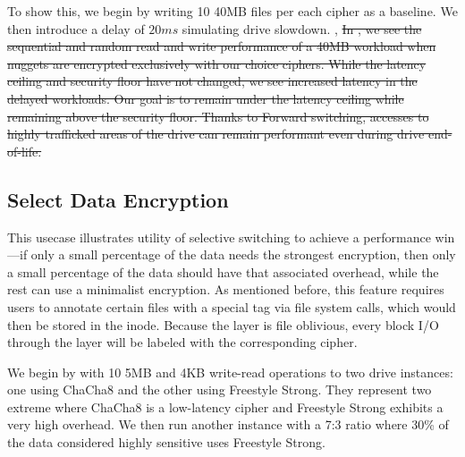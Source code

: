 

To show this, we begin by writing 10 40MB files per each cipher as a
baseline.  We then introduce a
delay of $20ms$ simulating drive slowdown.
,
\sout{
In , we see the sequential and random read and
write performance of a 40MB workload when nuggets are encrypted exclusively with
our choice ciphers. While the latency ceiling and security floor have not
changed, we see increased latency in the delayed workloads.
Our goal is to remain under the latency ceiling while remaining above the
security floor. Thanks to Forward switching, accesses to highly trafficked areas
of the drive can remain performant even during drive end-of-life.}



\subsection{Select Data Encryption} \label{subsec:uc2}


This usecase illustrates utility of selective switching to achieve a
performance win---if only a small percentage of the data needs the
strongest encryption, then only a small percentage of the data should have
that associated overhead, while the rest can use a minimalist encryption.
As mentioned before, this feature requires users to annotate certain files
with a special tag via file system calls, which would then be stored in
the inode.  Because the \sys layer is file oblivious, every block I/O
through the \sys layer will be labeled with the corresponding cipher.

We begin by with 10 5MB and 4KB write-read operations to two \sys drive
instances: one using ChaCha8 and the other using Freestyle Strong.  They
represent two extreme where ChaCha8 is a low-latency cipher and Freestyle
Strong exhibits a very high overhead.  We then run another \sys instance
with a 7:3 ratio where 30\% of the data considered highly sensitive uses
Freestyle Strong.


